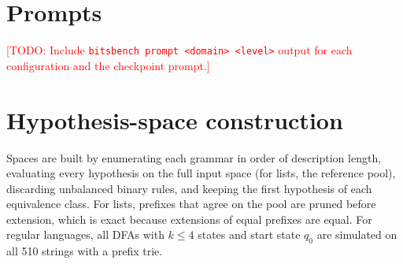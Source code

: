 \documentclass[11pt]{article}
\newcommand{\todo}[1]{\textcolor{red}{[TODO: #1]}}
\begin{document}



\appendix
\section{Prompts}
\todo{Include \texttt{bitsbench prompt <domain> <level>} output for each configuration and the
checkpoint prompt.}

\section{Hypothesis-space construction}
Spaces are built by enumerating each grammar in order of description length, evaluating every
hypothesis on the full input space (for lists, the reference pool), discarding unbalanced binary rules,
and keeping the first hypothesis of each equivalence class. For lists, prefixes that agree on the pool
are pruned before extension, which is exact because extensions of equal prefixes are equal. For regular
languages, all DFAs with $k\le 4$ states and start state $q_0$ are simulated on all 510 strings with a
prefix trie.
\end{document}
